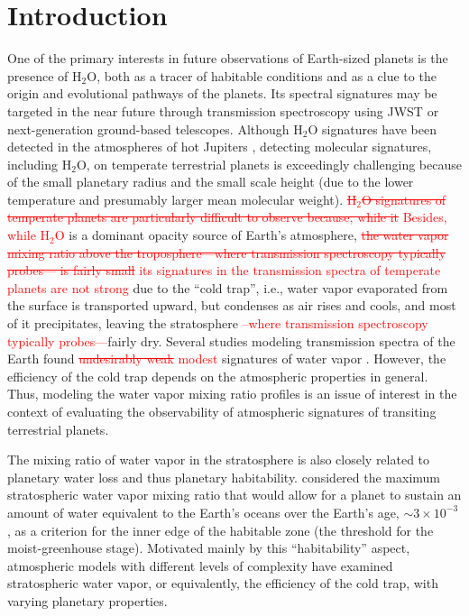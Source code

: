 \documentclass[11pt,numberedappendix,twocolappendix,]{emulateapj}
\def\water{H$_2$O}
\def\wv{water vapor}
\def\addYF#1{\textcolor{red}{#1}}
\def\changeYF#1#2{\textcolor{red}{\sout{#1} #2}}
\begin{document}



\section{Introduction}
\label{s:intro}

One of the primary interests in future observations of Earth-sized planets is the presence of \water{}, both as a tracer of habitable conditions and as a clue to the origin and evolutional pathways of the planets. 
Its spectral signatures may be targeted in the near future through transmission spectroscopy using JWST or next-generation ground-based telescopes.
%
Although \water{} signatures have been detected in the atmospheres of hot Jupiters \citep[e.g.][]{Tinetti2007,Sing2016}, detecting molecular signatures, including \water{}, on temperate terrestrial planets is exceedingly challenging \citep{Cowan2015} because of the small planetary radius and the small scale height (due to the lower temperature and presumably larger mean molecular weight). 
\changeYF{ \water{} signatures of temperate planets are particularly difficult to observe because, while it}{Besides, while \water{} } is a dominant opacity source of Earth's atmosphere, \changeYF{the \wv{} mixing ratio above the troposphere---where transmission spectroscopy typically probes--- is fairly small}{its signatures in the transmission spectra of temperate planets are not strong} due to the ``cold trap'', i.e., \wv{} evaporated from the surface is transported upward, but condenses as air rises and cools, and most of it precipitates, leaving the stratosphere \addYF{--where transmission spectroscopy typically probes---}fairly dry. 
Several studies modeling transmission spectra of the Earth found \changeYF{undesirably weak}{modest} signatures of \wv{} \citep[e.g.][]{Ehrenreich2006, Kaltenegger2009, Betremieux2013, Misra2014}. 
However, the efficiency of the cold trap depends on the atmospheric properties in general. 
Thus, modeling the \wv{} mixing ratio profiles is an issue of interest in the context of evaluating the observability of atmospheric signatures of transiting terrestrial planets. 

The mixing ratio of \wv{} in the stratosphere is also closely related to planetary water loss and thus planetary habitability. 
\citet{Kasting1993} considered the maximum stratospheric \wv{} mixing ratio that would allow for a planet to sustain an amount of water equivalent to the  Earth's oceans over the Earth's age, $\sim 3 \times 10^{-3}$, as a criterion for the inner edge of the habitable zone (the threshold for the moist-greenhouse stage). 
Motivated mainly by this ``habitability'' aspect, atmospheric models with different levels of complexity have examined stratospheric \wv{}, or equivalently, the efficiency of the cold trap, with varying planetary properties. 
\end{document}

